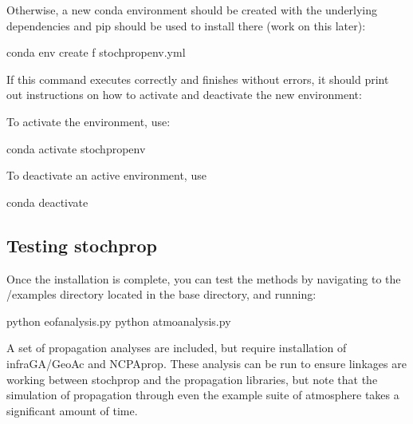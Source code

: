 \documentclass[letterpaper,10pt,english]{sphinxmanual}
\begin{document}
Otherwise, a new conda environment should be created with the underlying dependencies and pip should be used to install there (work on this later):

\begin{sphinxVerbatim}[commandchars=\\\{\}]
\PYGZgt{}\PYGZgt{} conda env create \PYGZhy{}f stochprop\PYGZus{}env.yml
\end{sphinxVerbatim}

If this command executes correctly and finishes without errors, it should print out instructions on how to activate and deactivate the new environment:

To activate the environment, use:

\begin{sphinxVerbatim}[commandchars=\\\{\}]
\PYGZgt{}\PYGZgt{} conda activate stochprop\PYGZus{}env
\end{sphinxVerbatim}

To deactivate an active environment, use

\begin{sphinxVerbatim}[commandchars=\\\{\}]
\PYGZgt{}\PYGZgt{} conda deactivate
\end{sphinxVerbatim}


\subsection{Testing stochprop}
\label{\detokenize{installation:testing-stochprop}}
Once the installation is complete, you can test the methods by navigating to the /examples directory located in the base directory, and running:

\begin{sphinxVerbatim}[commandchars=\\\{\}]
\PYGZgt{}\PYGZgt{} python eof\PYGZus{}analysis.py
\PYGZgt{}\PYGZgt{} python atmo\PYGZus{}analysis.py
\end{sphinxVerbatim}

A set of propagation analyses are included, but require installation of infraGA/GeoAc and NCPAprop.  These analysis can be run to ensure linkages are
working between stochprop and the propagation libraries, but note that the simulation of propagation through even the example suite of atmosphere
takes a significant amount of time.
\end{document}
